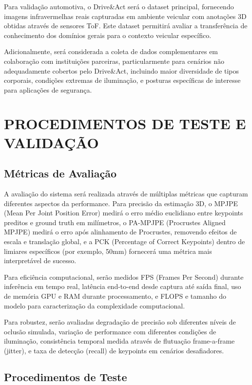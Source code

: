 \documentclass[12pt, a4paper]{article}
\begin{document}
Para validação automotiva, o Drive\&Act será o dataset principal, fornecendo imagens infravermelhas reais capturadas em ambiente veicular com anotações 3D obtidas através de sensores ToF. Este dataset permitirá avaliar a transferência de conhecimento dos domínios gerais para o contexto veicular específico.

Adicionalmente, será considerada a coleta de dados complementares em colaboração com instituições parceiras, particularmente para cenários não adequadamente cobertos pelo Drive\&Act, incluindo maior diversidade de tipos corporais, condições extremas de iluminação, e posturas específicas de interesse para aplicações de segurança.

\section{PROCEDIMENTOS DE TESTE E VALIDAÇÃO}

\subsection{Métricas de Avaliação}

A avaliação do sistema será realizada através de múltiplas métricas que capturam diferentes aspectos da performance. Para precisão da estimação 3D, o MPJPE (Mean Per Joint Position Error) medirá o erro médio euclidiano entre keypoints preditos e ground truth em milímetros, o PA-MPJPE (Procrustes Aligned MPJPE) medirá o erro após alinhamento de Procrustes, removendo efeitos de escala e translação global, e a PCK (Percentage of Correct Keypoints) dentro de limiares específicos (por exemplo, 50mm) fornecerá uma métrica mais interpretável de sucesso.

Para eficiência computacional, serão medidos FPS (Frames Per Second) durante inferência em tempo real, latência end-to-end desde captura até saída final, uso de memória GPU e RAM durante processamento, e FLOPS e tamanho do modelo para caracterização da complexidade computacional.

Para robustez, serão avaliadas degradação de precisão sob diferentes níveis de oclusão simulada, variação de performance com diferentes condições de iluminação, consistência temporal medida através de flutuação frame-a-frame (jitter), e taxa de detecção (recall) de keypoints em cenários desafiadores.

\subsection{Procedimentos de Teste}
\end{document}
